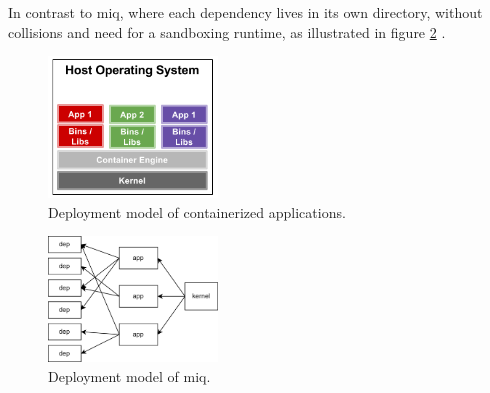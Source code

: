In contrast to miq, where each dependency lives in its own directory, without
collisions and need for a sandboxing runtime, as illustrated in figure
\ref{fig:graph6} .

\begin{figure}[hbt]
    \centering
    \includegraphics[width=0.4\textwidth]{Screenshot 2023-05-29 173501.png}
    \caption{Deployment model of containerized applications.}
    \label{fig:graph5}
\end{figure}

\begin{figure}[hbt]
    \centering
    \includegraphics[width=0.4\textwidth]{dep2.png}
    \caption{Deployment model of miq.}
    \label{fig:graph6}
\end{figure}



